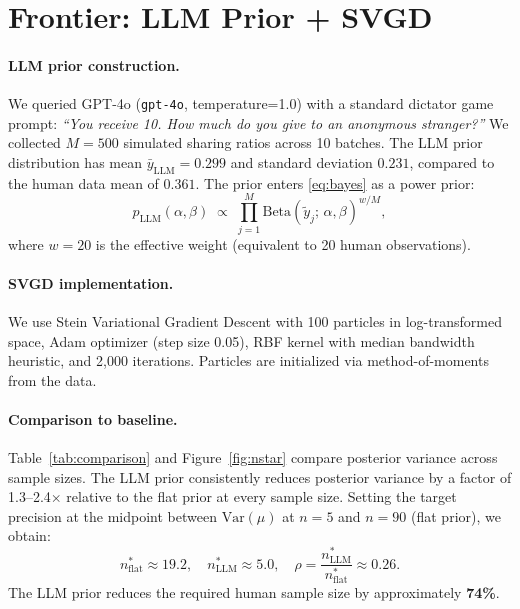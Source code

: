 \documentclass[11pt]{article}
\begin{document}
\section{Frontier: LLM Prior + SVGD}

\paragraph{LLM prior construction.}
We queried GPT-4o (\texttt{gpt-4o}, temperature=1.0) with a standard dictator game prompt: \emph{``You receive \texteuro{}10. How much do you give to an anonymous stranger?''}
We collected $M = 500$ simulated sharing ratios across 10 batches.
The LLM prior distribution has mean $\bar{y}_{\mathrm{LLM}} = 0.299$ and standard deviation $0.231$, compared to the human data mean of $0.361$.
The prior enters \eqref{eq:bayes} as a power prior:
\begin{equation}
  p_{\mathrm{LLM}}(\alpha,\beta) \;\propto\; \prod_{j=1}^{M} \mathrm{Beta}(\tilde{y}_j;\, \alpha, \beta)^{w/M},
\end{equation}
where $w = 20$ is the effective weight (equivalent to 20 human observations).

\paragraph{SVGD implementation.}
We use Stein Variational Gradient Descent with 100 particles in log-transformed space, Adam optimizer (step size 0.05), RBF kernel with median bandwidth heuristic, and 2{,}000 iterations.
Particles are initialized via method-of-moments from the data.

\paragraph{Comparison to baseline.}
Table~\ref{tab:comparison} and Figure~\ref{fig:nstar} compare posterior variance across sample sizes.
The LLM prior consistently reduces posterior variance by a factor of 1.3--2.4$\times$ relative to the flat prior at every sample size.
Setting the target precision at the midpoint between $\mathrm{Var}(\mu)$ at $n=5$ and $n=90$ (flat prior), we obtain:
\begin{equation}
  n^*_{\mathrm{flat}} \approx 19.2, \quad n^*_{\mathrm{LLM}} \approx 5.0, \quad \rho = \frac{n^*_{\mathrm{LLM}}}{n^*_{\mathrm{flat}}} \approx 0.26.
\end{equation}
The LLM prior reduces the required human sample size by approximately \textbf{74\%}.
\end{document}
